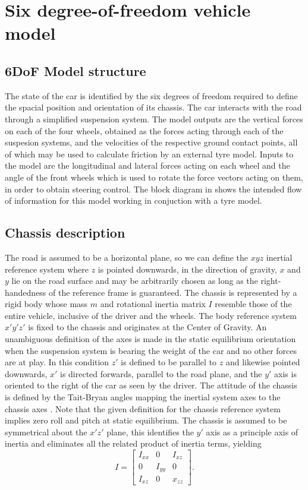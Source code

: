 \chapter{Six degree-of-freedom vehicle model}
\label{chap:6dof}
\section{6DoF Model structure}
\label{sec:6dofconcept}
The state of the car is identified by the six degrees of freedom required to define the spacial position and orientation of its chassis. The car interacts with the road through a simplified suspension system.
The model outputs are the vertical forces on each of the four wheels, obtained as the forces acting through each of the suspesion systems, and the velocities of the respective ground contact points, all of which may be used to calculate friction by an external tyre model.
Inputs to the model are the longitudinal and lateral forces acting on each wheel and the angle of the front wheels which is used to rotate the force vectors acting on them, in order to obtain steering control.
The block diagram in  shows the intended flow of information for this model working in conjuction with a tyre model.
\section{Chassis description}
\label{sec:body}
The road is assumed to be a horizontal plane, so we can define the $xyz$ inertial reference system where $z$ is pointed downwards, in the direction of gravity, $x$ and $y$ lie on the road surface and may be arbitrarily chosen as long as the right-handedness of the reference frame is guaranteed.
The chassis is represented by a rigid body whose mass $m$ and rotational inertia matrix $I$ resemble those of the entire vehicle, inclusive of the driver and the wheels.
The body reference system $x'y'z'$ is fixed to the chassis and originates at the Center of Gravity. An unambiguous definition of the axes is made in the static equilibrium orientation when the suspension system is bearing the weight of the car and no other forces are at play. In this condition $z'$ is defined to be parallel to $z$ and likewise pointed downwards, $x'$ is directed forwards, parallel to the road plane, and the $y'$ axis is oriented to the right of the car as seen by the driver.
The attitude of the chassis is defined by the Tait-Bryan angles mapping the inertial system axes to the chassis axes 
. Note that the given definition for the chassis reference system implies zero roll and pitch at static equilibrium.
The chassis is assumed to be symmetrical about the $x'z'$ plane, this identifies the $y'$ axis as a principle axis of inertia and eliminates all the related product of inertia terms, yielding
$$ I = \begin{bmatrix}
    I_{xx} & 0      & I_{xz}\\
    0      & I_{yy} & 0     \\
    I_{xz} & 0      & x_{zz}
\end{bmatrix}.$$

